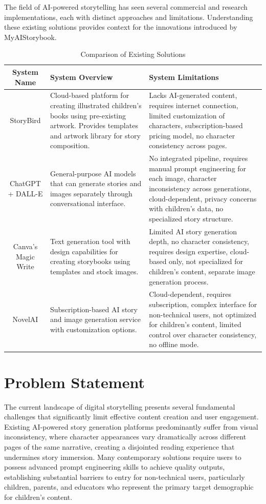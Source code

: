 The field of AI-powered storytelling has seen several commercial and research implementations, each with distinct approaches and limitations. Understanding these existing solutions provides context for the innovations introduced by MyAIStorybook.

\begin{table}[H]
\centering
\caption{Comparison of Existing Solutions}
\begin{tabular}{|c|p{5cm}|p{5cm}|}
\hline
\textbf{System Name} & \textbf{System Overview} & \textbf{System Limitations} \\ \hline
StoryBird & Cloud-based platform for creating illustrated children's books using pre-existing artwork. Provides templates and artwork library for story composition. & Lacks AI-generated content, requires internet connection, limited customization of characters, subscription-based pricing model, no character consistency across pages. \\ \hline
ChatGPT + DALL-E & General-purpose AI models that can generate stories and images separately through conversational interface. & No integrated pipeline, requires manual prompt engineering for each image, character inconsistency across generations, cloud-dependent, privacy concerns with children's data, no specialized story structure. \\ \hline
Canva's Magic Write & Text generation tool with design capabilities for creating storybooks using templates and stock images. & Limited AI story generation depth, no character consistency, requires design expertise, cloud-based only, not specialized for children's content, separate image generation process. \\ \hline
NovelAI & Subscription-based AI story and image generation service with customization options. & Cloud-dependent, requires subscription, complex interface for non-technical users, not optimized for children's content, limited control over character consistency, no offline mode. \\ \hline
\end{tabular}
\label{tab:system_comparison}
\end{table}

\section{Problem Statement}

The current landscape of digital storytelling presents several fundamental challenges that significantly limit effective content creation and user engagement. Existing AI-powered story generation platforms predominantly suffer from visual inconsistency, where character appearances vary dramatically across different pages of the same narrative, creating a disjointed reading experience that undermines story immersion. Many contemporary solutions require users to possess advanced prompt engineering skills to achieve quality outputs, establishing substantial barriers to entry for non-technical users, particularly children, parents, and educators who represent the primary target demographic for children's content.

